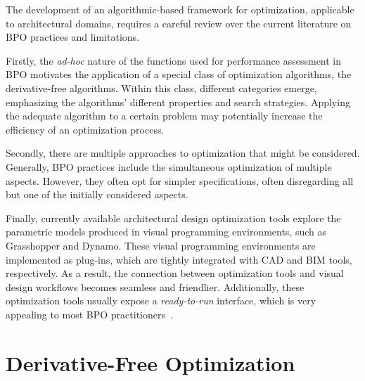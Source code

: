 \cleardoublepage
\label{chap:back}

	The development of an algorithmic-based framework for optimization, applicable to architectural domains, requires a careful review over the current literature on \ac{BPO} practices and limitations. 
	
	Firstly, the \textit{ad-hoc} nature of the functions used for performance assessment in \ac{BPO} motivates the application of a special class of optimization algorithms, the derivative-free algorithms. Within this class, different categories emerge, emphasizing the algorithms' different properties and search strategies. Applying the adequate algorithm to a certain problem may potentially increase the efficiency of an optimization process. 
	
	Secondly, there are multiple approaches to optimization that might be considered. Generally, \ac{BPO} practices include the simultaneous optimization of multiple aspects. However, they often opt for simpler specifications, often disregarding all but one of the initially considered aspects. 

	Finally, currently available architectural design optimization tools explore the parametric models produced in visual programming environments, such as Grasshopper and Dynamo. These visual programming environments are implemented as plug-ins, which are tightly integrated with \ac{CAD} and \ac{BIM} tools, respectively. As a result, the connection between optimization tools and visual design workflows becomes seamless and friendlier. Additionally, these optimization tools usually expose a \textit{ready-to-run} interface, which is very appealing to most \ac{BPO} practitioners~\cite{Cichocka2017SURVEY}.
	
	
	
\section{Derivative-Free Optimization}
\label{sec:dfo}

